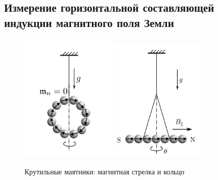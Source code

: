 \documentclass[12pt,a4paper]{article}
\begin{document}
\subsection{Измерение горизонтальной составляющей индукции магнитного
поля Земли}
  \begin{figure}[H]
    \includegraphics*[width=0.4\textwidth]{03_23_12.png}
    \includegraphics*[width=0.4\textwidth]{2023-10-02-17-27-25.png}
    \caption{Крутильные маятники: магнитная стрелка и кольцо}
  \end{figure}
\end{document}
